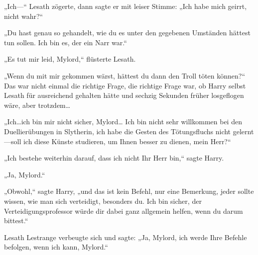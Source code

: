 „Ich—“ Lesath zögerte, dann sagte er mit leiser Stimme: „Ich habe mich geirrt, nicht wahr?“

„Du hast genau so gehandelt, wie du es unter den gegebenen Umständen hättest tun sollen. Ich bin es, der ein Narr war.“

„Es tut mir leid, Mylord,“ flüsterte Lesath.

„Wenn du mit mir gekommen wärst, hättest du dann den Troll töten können?“
Das war nicht einmal die richtige Frage, die richtige Frage war, ob Harry selbst Lesath für ausreichend gehalten hätte und sechzig Sekunden früher losgeflogen wäre, aber trotzdem…

„Ich…ich bin mir nicht sicher, Mylord… Ich bin nicht sehr willkommen bei den Duellierübungen in Slytherin, ich habe die Gesten des Tötungsfluchs nicht gelernt—soll ich diese Künste studieren, um Ihnen besser zu dienen, mein Herr?“

„Ich bestehe weiterhin darauf, dass ich nicht Ihr Herr bin,“ sagte Harry.

„Ja, Mylord.“

„Obwohl,“ sagte Harry, „und das ist kein Befehl, nur eine Bemerkung, jeder sollte wissen, wie man sich verteidigt, besonders du. Ich bin sicher, der Verteidigungsprofessor würde dir dabei ganz allgemein helfen, wenn du darum bittest.“

Lesath Lestrange verbeugte sich und sagte: „Ja, Mylord, ich werde Ihre Befehle befolgen, wenn ich kann, Mylord.“

